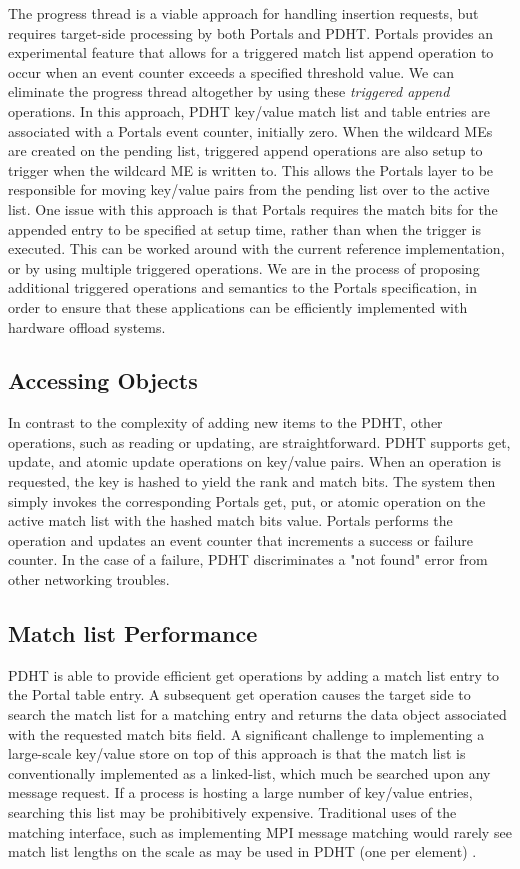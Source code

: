 The progress thread is a viable approach for handling insertion requests, but
requires target-side processing by both Portals and PDHT. Portals provides an
experimental feature that allows for a triggered match list append operation to
occur when an event counter exceeds a specified threshold value. We can
eliminate the progress thread altogether by using these {\em triggered append}
operations. In this approach, PDHT key/value match list and table entries are
associated with a Portals event counter, initially zero.  When the wildcard MEs
are created on the pending list, triggered append operations are also setup to
trigger when the wildcard ME is written to. This allows the Portals layer to be
responsible for moving key/value pairs from the pending list over to the active
list. One issue with this approach is that Portals requires the match bits for
the appended entry to be specified at setup time, rather than when the trigger
is executed. This can be worked around with the current reference
implementation, or by using multiple triggered operations. We are in the
process of proposing additional triggered operations and semantics to the Portals
specification, in order to ensure that these applications can be efficiently
implemented with hardware offload systems.

\subsection{Accessing Objects}

In contrast to the complexity of adding new items to the PDHT, other
operations, such as reading or updating, are straightforward. PDHT supports
get, update, and atomic update operations on key/value pairs.  When an
operation is requested, the key is hashed to yield the rank and match bits. The
system then simply invokes the corresponding Portals get, put, or atomic
operation on the active match list with the hashed match bits value. Portals
performs the operation and updates an event counter that increments a success
or failure counter. In the case of a failure, PDHT discriminates a "not found"
error from other networking troubles.

\subsection{Match list Performance}

PDHT is able to provide efficient get operations by adding a match list entry
to the Portal table entry. A subsequent get operation causes the target side
to search the match list for a matching entry and returns the data object
associated with the requested match bits field. A significant challenge to 
implementing a large-scale key/value store on top of this approach is that
the match list is conventionally implemented as a linked-list, which much be
searched upon any message request. If a process is hosting a large number
of key/value entries, searching this list may be prohibitively expensive.
Traditional uses of the matching interface, such as implementing MPI message
matching would rarely see match list lengths on the scale as may be used in 
PDHT (one per element) \cite{flajslik:16}.


